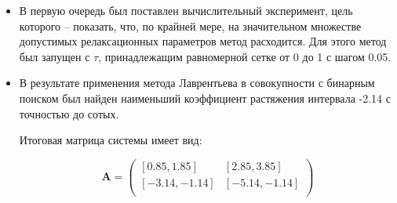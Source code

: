 \begin{itemize}
	\item В первую очередь был поставлен вычислительный эксперимент, цель которого -- показать, что, по крайней мере, на значительном множестве допустимых релаксационных параметров метод расходится. Для этого метод был запущен с $\tau$, принадлежащим равномерной сетке от 0 до 1 с шагом 0.05.
	
	\item В результате применения метода Лаврентьева в совокупности с бинарным поиском был найден наименьший коэффициент растяжения интервала -2.14 с точностью до сотых.
	
	Итоговая матрица системы имеет вид:
	
	\begin{equation}
	\mathbf{A}=
	\begin{pmatrix}
	[0.85, 1.85] & [2.85, 3.85] \\
	[-3.14, -1.14] & [-5.14, -1.14] \\
	\end{pmatrix}
	\end{equation}
	
\end{itemize}